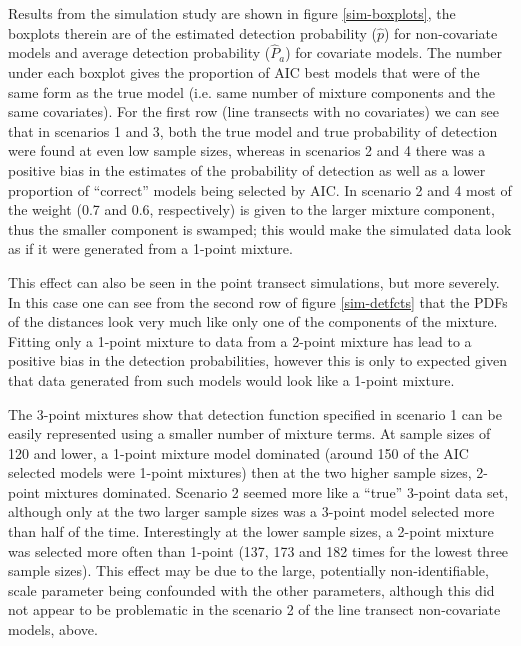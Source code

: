 Results from the simulation study are shown in figure \ref{sim-boxplots}, the boxplots therein are of the estimated detection probability ($\hat{p}$) for non-covariate models and average detection probability ($\hat{P}_a$) for covariate models. The number under each boxplot gives the proportion of AIC best models that were of the same form as the true model (i.e. same number of mixture components and the same covariates). For the first row (line transects with no covariates) we can see that in scenarios 1 and 3, both the true model and true probability of detection were found at even low sample sizes, whereas in scenarios 2 and 4 there was a positive bias in the estimates of the probability of detection as well as a lower proportion of ``correct'' models being selected by AIC. In scenario 2 and 4 most of the weight (0.7 and 0.6, respectively) is given to the larger mixture component, thus the smaller component is swamped; this would make the simulated data look as if it were generated from a 1-point mixture.

This effect can also be seen in the point transect simulations, but more severely. In this case one can see from the second row of figure \ref{sim-detfcts} that the PDFs of the distances look very much like only one of the components of the mixture. Fitting only a 1-point mixture to data from a 2-point mixture has lead to a positive bias in the detection probabilities, however this is only to expected given that data generated from such models would look like a 1-point mixture.

The 3-point mixtures show that detection function specified in scenario 1 can be easily represented using a smaller number of mixture terms. At sample sizes of 120 and lower, a 1-point mixture model dominated (around 150 of the AIC selected models were 1-point mixtures) then at the two higher sample sizes, 2-point mixtures dominated. Scenario 2 seemed more like a ``true'' 3-point data set, although only at the two larger sample sizes was a 3-point model selected more than half of the time. Interestingly at the lower sample sizes, a 2-point mixture was selected more often than 1-point (137, 173 and 182 times for the lowest three sample sizes). This effect may be due to the large, potentially non-identifiable, scale parameter being confounded with the other parameters, although this did not appear to be problematic in the scenario 2 of the line transect non-covariate models, above.

